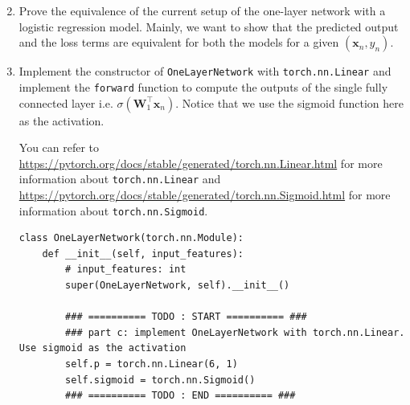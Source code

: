 \begin{enumerate}
\setcounter{enumi}{1}

\item {}
Prove the equivalence of the current setup of the one-layer network with a logistic regression model. Mainly, we want to show that the predicted output and the loss terms are equivalent for both the models for a given $(\mathbf{x}_n, y_n)$.


\item {}
Implement the constructor of \verb|OneLayerNetwork| with \verb|torch.nn.Linear| and implement the \verb|forward| function to compute the outputs of the single fully connected layer i.e. $\sigma(\mathbf{W}_1^\top \mathbf{x}_n)$. Notice that we use the sigmoid function here as the activation.

You can refer to \url{https://pytorch.org/docs/stable/generated/torch.nn.Linear.html} for more information about \verb|torch.nn.Linear| and \url{https://pytorch.org/docs/stable/generated/torch.nn.Sigmoid.html} for more information about \verb|torch.nn.Sigmoid|.

\begin{verbatim}
class OneLayerNetwork(torch.nn.Module):
    def __init__(self, input_features):
        # input_features: int
        super(OneLayerNetwork, self).__init__()

        ### ========== TODO : START ========== ###
        ### part c: implement OneLayerNetwork with torch.nn.Linear. Use sigmoid as the activation
        self.p = torch.nn.Linear(6, 1)
        self.sigmoid = torch.nn.Sigmoid()
        ### ========== TODO : END ========== ###


\end{verbatim}
\end{enumerate}
